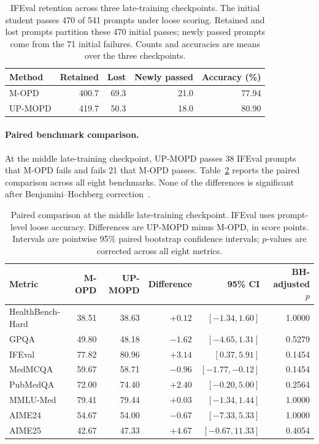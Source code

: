 \documentclass{article}
\begin{document}
\begin{table}[H]
\centering
\small
\caption{IFEval retention across three late-training checkpoints.
The initial student passes 470 of 541 prompts under loose scoring.
Retained and lost prompts partition these 470 initial passes; newly
passed prompts come from the 71 initial failures. Counts and accuracies
are means over the three checkpoints.}
\label{tab:ifeval_retention}
\begin{tabular*}{\linewidth}{@{\extracolsep{\fill}}lrrrr@{}}
\toprule
Method & Retained & Lost & Newly passed & Accuracy (\%) \\
\midrule
M-OPD & 400.7 & 69.3 & 21.0 & 77.94 \\
UP-MOPD & 419.7 & 50.3 & 18.0 & 80.90 \\
\bottomrule
\end{tabular*}
\end{table}

\paragraph{Paired benchmark comparison.}
At the middle late-training checkpoint, UP-MOPD passes 38 IFEval prompts
that M-OPD fails and fails 21 that M-OPD passes.
Table~\ref{tab:paired} reports the paired comparison across all eight
benchmarks. None of the differences is significant after
Benjamini--Hochberg correction~\citep{ref15}.

\begin{table}[H]
\centering
\caption{Paired comparison at the middle late-training checkpoint.
IFEval uses prompt-level loose accuracy. Differences are UP-MOPD minus
M-OPD, in score points. Intervals are pointwise 95\% paired bootstrap
confidence intervals; $p$-values are corrected across all eight metrics.}
\label{tab:paired}
\renewcommand{\arraystretch}{1.10}
\footnotesize
\begin{tabular*}{\linewidth}{@{\extracolsep{\fill}}lrrrrr@{}}
\toprule
\textbf{Metric} & \textbf{M-OPD} & \textbf{UP-MOPD}
& \textbf{Difference} & \textbf{95\% CI}
& \shortstack{\textbf{BH-adjusted}\\$p$} \\
\midrule
HealthBench-Hard & 38.51 & 38.63 & $+0.12$ & $[-1.34,1.60]$ & 1.0000 \\
GPQA & 49.80 & 48.18 & $-1.62$ & $[-4.65,1.31]$ & 0.5279 \\
IFEval & 77.82 & 80.96 & $+3.14$ & $[0.37,5.91]$ & 0.1454 \\
MedMCQA & 59.67 & 58.71 & $-0.96$ & $[-1.77,-0.12]$ & 0.1454 \\
PubMedQA & 72.00 & 74.40 & $+2.40$ & $[-0.20,5.00]$ & 0.2564 \\
MMLU-Med & 79.41 & 79.44 & $+0.03$ & $[-1.34,1.44]$ & 1.0000 \\
AIME24 & 54.67 & 54.00 & $-0.67$ & $[-7.33,5.33]$ & 1.0000 \\
AIME25 & 42.67 & 47.33 & $+4.67$ & $[-0.67,11.33]$ & 0.4054 \\

\bottomrule
\end{tabular*}
\end{table}
\end{document}

